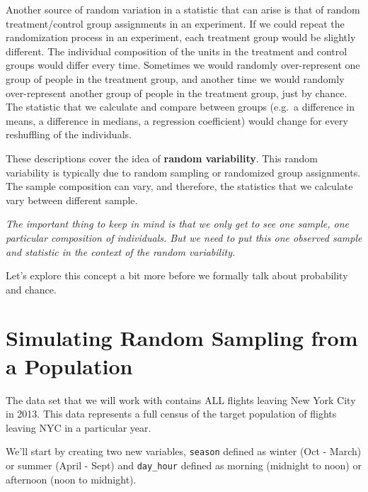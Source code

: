 \documentclass[]{book}
\begin{document}
Another source of random variation in a statistic that can arise is that of random treatment/control group assignments in an experiment. If we could repeat the randomization process in an experiment, each treatment group would be slightly different. The individual composition of the units in the treatment and control groups would differ every time. Sometimes we would randomly over-represent one group of people in the treatment group, and another time we would randomly over-represent another group of people in the treatment group, just by chance. The statistic that we calculate and compare between groups (e.g.~a difference in means, a difference in medians, a regression coefficient) would change for every reshuffling of the individuals.

These descriptions cover the idea of \textbf{random variability}. This random variability is typically due to random sampling or randomized group assignments. The sample composition can vary, and therefore, the statistics that we calculate vary between different sample.

\emph{The important thing to keep in mind is that we only get to see one sample, one particular composition of individuals. But we need to put this one observed sample and statistic in the context of the random variability.}

Let's explore this concept a bit more before we formally talk about probability and chance.

\hypertarget{simulating-random-sampling-from-a-population}{%
\section{Simulating Random Sampling from a Population}\label{simulating-random-sampling-from-a-population}}

The data set that we will work with contains ALL flights leaving New York City in 2013. This data represents a full census of the target population of flights leaving NYC in a particular year.

We'll start by creating two new variables, \texttt{season} defined as winter (Oct - March) or summer (April - Sept) and \texttt{day\_hour} defined as morning (midnight to noon) or afternoon (noon to midnight).
\end{document}
